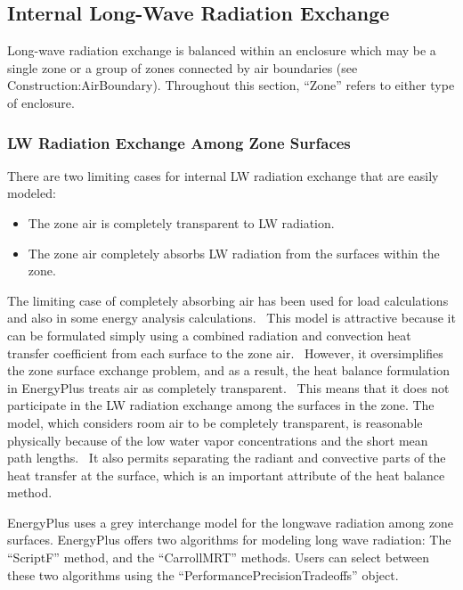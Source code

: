 \subsection{Internal Long-Wave Radiation Exchange}\label{internal-long-wave-radiation-exchange}

Long-wave radiation exchange is balanced within an enclosure which may be a single zone or a group of zones connected by air boundaries (see Construction:AirBoundary). Throughout this section, ``Zone'' refers to either type of enclosure.

\subsubsection{LW Radiation Exchange Among Zone Surfaces}\label{lw-radiation-exchange-among-zone-surfaces}

There are two limiting cases for internal LW radiation exchange that are easily modeled:

\begin{itemize}
\item
The zone air is completely transparent to LW radiation.
\item
The zone air completely absorbs LW radiation from the surfaces within the zone.
\end{itemize}

The limiting case of completely absorbing air has been used for load calculations and also in some energy analysis calculations.~ This model is attractive because it can be formulated simply using a combined radiation and convection heat transfer coefficient from each surface to the zone air.~ However, it oversimplifies the zone surface exchange problem, and as a result, the heat balance formulation in EnergyPlus treats air as completely transparent.~ This means that it does not participate in the LW radiation exchange among the surfaces in the zone. The model, which considers room air to be completely transparent, is reasonable physically because of the low water vapor concentrations and the short mean path lengths.~ It also permits separating the radiant and convective parts of the heat transfer at the surface, which is an important attribute of the heat balance method.

EnergyPlus uses a grey interchange model for the longwave radiation among zone surfaces. EnergyPlus offers two algorithms for modeling long wave radiation: The ``ScriptF'' method, and the ``CarrollMRT'' methods. Users can select between these two algorithms using the ``PerformancePrecisionTradeoffs'' object.

